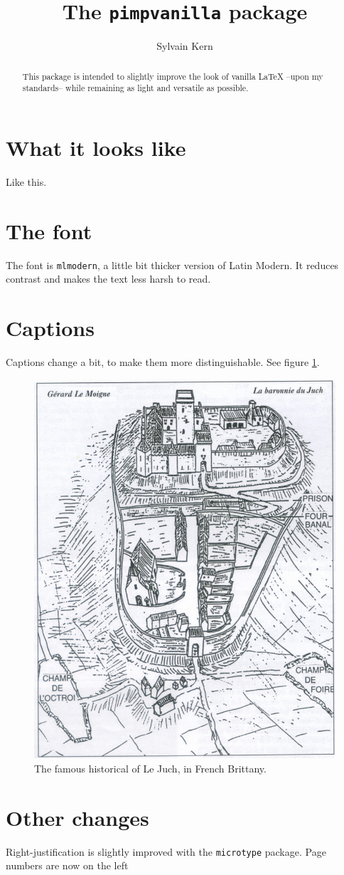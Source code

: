 \documentclass[12pt]{article}
\title{The \texttt{pimpvanilla} package}
\author{Sylvain Kern}
\begin{document}
\maketitle

\begin{abstract}
    This package is intended to slightly improve the look of vanilla \LaTeX{} --upon my standards-- while remaining as light and versatile as possible.
\end{abstract}

\section{What it looks like}

Like this. \lipsum[1-2]

\section{The font}

The font is \texttt{mlmodern}, a little bit thicker version of Latin Modern. It reduces contrast and makes the text less harsh to read.

\section{Captions}

Captions change a bit, to make them more distinguishable. See figure \ref{fig:juch}.

\begin{figure}
    \centering
    \includegraphics[width=.75\textwidth]{lejuch.png}
    \caption{The famous historical of Le Juch, in French Brittany. \lipsum[3]\label{fig:juch}}
\end{figure}


\section{Other changes}

Right-justification is slightly improved with the \texttt{microtype} package. Page numbers are now on the left
\end{document}
